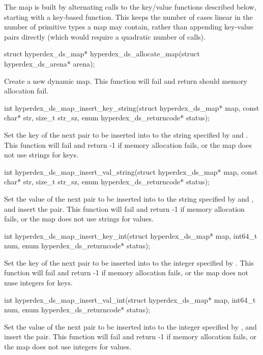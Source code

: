 The map is built by alternating calls to the key/value functions described
below, starting with a key-based function.  This keeps the number of cases
linear in the number of primitive types a map may contain, rather than appending
key-value pairs directly (which would require a quadratic number of calls).

\begin{ccode}
struct hyperdex_ds_map* hyperdex_ds_allocate_map(struct hyperdex_ds_arena* arena);
\end{ccode}
Create a new dynamic map.  This function will fail and return
 should memory allocation fail.

\begin{ccode}
int hyperdex_ds_map_insert_key_string(struct hyperdex_ds_map* map,
                                      const char* str, size_t str_sz,
                                      enum hyperdex_ds_returncode* status);
\end{ccode}
Set the key of the next pair to be inserted into  to the
string specified by  and .  This function will fail and
return -1 if memory allocation fails, or the map does not use strings for keys.

\begin{ccode}
int hyperdex_ds_map_insert_val_string(struct hyperdex_ds_map* map,
                                      const char* str, size_t str_sz,
                                      enum hyperdex_ds_returncode* status);
\end{ccode}
Set the value of the next pair to be inserted into  to the
string specified by  and , and insert the pair.  This
function will fail and return -1 if memory allocation fails, or the map does not
use strings for values.

\begin{ccode}
int hyperdex_ds_map_insert_key_int(struct hyperdex_ds_map* map,
                                   int64_t num,
                                   enum hyperdex_ds_returncode* status);
\end{ccode}
Set the key of the next pair to be inserted into  to the
integer specified by .  This function will fail and return -1 if
memory allocation fails, or the map does not nuse integers for keys.

\begin{ccode}
int hyperdex_ds_map_insert_val_int(struct hyperdex_ds_map* map,
                                   int64_t num,
                                   enum hyperdex_ds_returncode* status);
\end{ccode}
Set the value of the next pair to be inserted into  to the
integer specified by , and insert the pair.  This function will fail
and return -1 if memory allocation fails, or the map does not use integers for
values.

